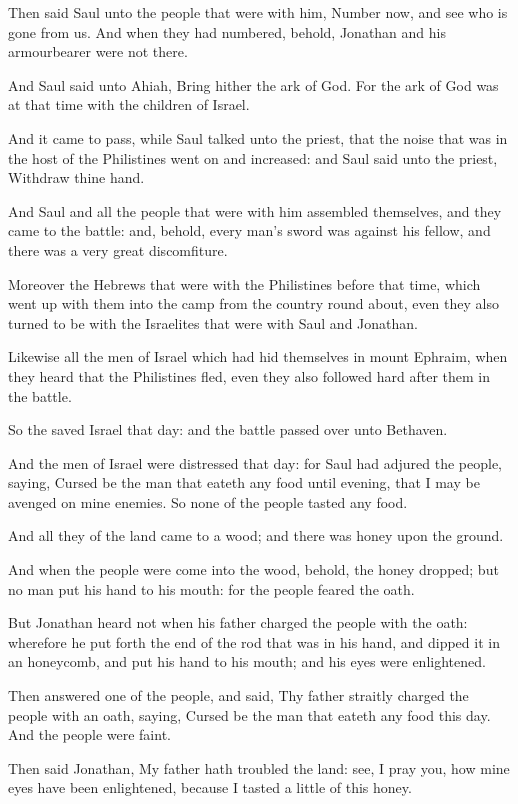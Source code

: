 \Verse Then said Saul unto the people that were with him, Number now, and see who is gone from us. And when they had numbered, behold, Jonathan and his armourbearer were not there.

\Verse And Saul said unto Ahiah, Bring hither the ark of God. For the ark of God was at that time with the children of Israel.

\Verse And it came to pass, while Saul talked unto the priest, that the noise that was in the host of the Philistines went on and increased: and Saul said unto the priest, Withdraw thine hand.

\Verse And Saul and all the people that were with him assembled themselves, and they came to the battle: and, behold, every man's sword was against his fellow, and there was a very great discomfiture.

\Verse Moreover the Hebrews that were with the Philistines before that time, which went up with them into the camp from the country round about, even they also turned to be with the Israelites that were with Saul and Jonathan.

\Verse Likewise all the men of Israel which had hid themselves in mount Ephraim, when they heard that the Philistines fled, even they also followed hard after them in the battle.

\Verse So the \LORD saved Israel that day: and the battle passed over unto Bethaven.

\Verse And the men of Israel were distressed that day: for Saul had adjured the people, saying, Cursed be the man that eateth any food until evening, that I may be avenged on mine enemies. So none of the people tasted any food.

\Verse And all they of the land came to a wood; and there was honey upon the ground.

\Verse And when the people were come into the wood, behold, the honey dropped; but no man put his hand to his mouth: for the people feared the oath.

\Verse But Jonathan heard not when his father charged the people with the oath: wherefore he put forth the end of the rod that was in his hand, and dipped it in an honeycomb, and put his hand to his mouth; and his eyes were enlightened.

\Verse Then answered one of the people, and said, Thy father straitly charged the people with an oath, saying, Cursed be the man that eateth any food this day. And the people were faint.

\Verse Then said Jonathan, My father hath troubled the land: see, I pray you, how mine eyes have been enlightened, because I tasted a little of this honey.

